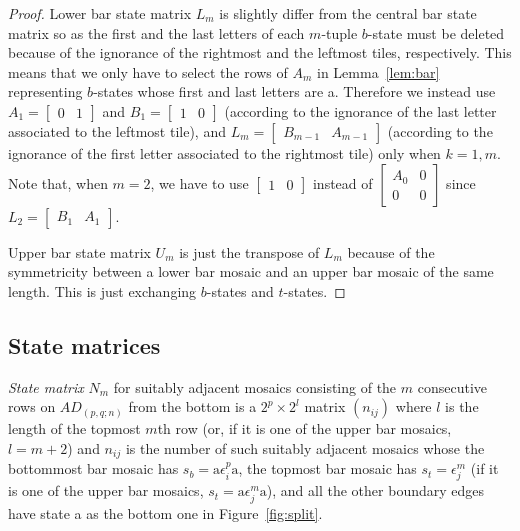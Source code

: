 \documentclass[11pt,a4paper]{amsart}
\begin{document}
\begin{proof}
Lower bar state matrix $L_m$ is slightly differ from the central bar state matrix
so as the first and the last letters of each $m$-tuple $b$-state must be deleted
because of the ignorance of the rightmost and the leftmost tiles, respectively.
This means that we only have to select the rows of $A_m$ in Lemma~\ref{lem:bar}
representing $b$-states whose first and last letters are a.
Therefore we instead use $A_1 = \begin{bmatrix} 0 & 1 \end{bmatrix}$ and
$B_1 = \begin{bmatrix} 1 & 0 \end{bmatrix}$
(according to the ignorance of the last letter associated to the leftmost tile), and
$L_m = \begin{bmatrix} B_{m-1} & A_{m-1} \end{bmatrix}$
(according to the ignorance of the first letter associated to the rightmost tile) only when $k=1,m$.
Note that, when $m=2$,
we have to use $\begin{bmatrix} 1 & 0 \end{bmatrix}$ instead of $\begin{bmatrix} A_0 & 0 \\ 0 & 0 \end{bmatrix}$
since $L_2 = \begin{bmatrix} B_1 & A_1 \end{bmatrix}$.

Upper bar state matrix $U_m$ is just the transpose of $L_m$
because of the symmetricity between a lower bar mosaic and an upper bar mosaic of the same length.
This is just exchanging $b$-states and $t$-states.
\end{proof}


\subsection{State matrices}

{\em State matrix\/} $N_m$ for suitably adjacent mosaics consisting of the $m$ consecutive rows on $AD_{(p,q;n)}$ from the bottom
is a $2^p \! \times \! 2^l$ matrix $(n_{ij})$
where $l$ is the length of the topmost $m$th row (or, if it is one of the upper bar mosaics, $l = m \! + \! 2$)
and $n_{ij}$ is the number of such suitably adjacent mosaics
whose the bottommost bar mosaic has $s_b = \text{a} \epsilon^p_i \text{a}$,
the topmost bar mosaic has $s_t = \epsilon^m_j$
(if it is one of the upper bar mosaics, $s_t = \text{a} \epsilon^m_j \text{a}$),
and all the other boundary edges have state a as the bottom one in Figure~\ref{fig:split}.
\end{document}
